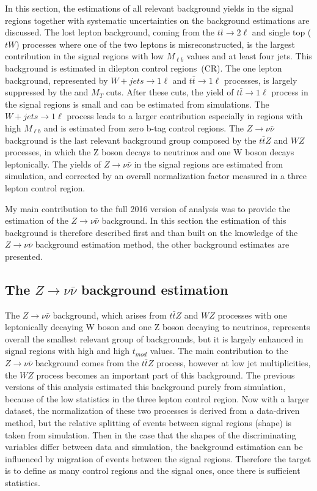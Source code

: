 In this section, the estimations of all relevant background yields in the signal regions together with systematic uncertainties on the background estimations are discussed. The lost lepton background, coming from the $t\bar{t} \to 2 \ell$ and single top ($tW$) processes where one of the two leptons is misreconstructed, is the largest contribution in the signal regions with low $M_{\ell b}$ values and at least four jets. This background is estimated in dilepton control regions~(CR). The one lepton background, represented by $W+jets \to 1\ell$  and $t\bar{t} \to 1\ell$ processes, is largely suppressed by the \MET and $M_{T}$ cuts. After these cuts, the yield of $t\bar{t} \to 1\ell$ process in the signal regions is small and can be estimated from simulations. The $W+jets \to 1\ell$  process leads to a larger contribution especially in regions with high $M_{\ell b}$ and is estimated from zero b-tag control regions. The $Z \to \nu \bar{\nu}$ background is the last relevant background group composed by the $t\bar{t}Z$ and $WZ$ processes, in which the Z boson decays to neutrinos and one W boson decays leptonically. The yields of $Z \to \nu \bar{\nu}$ in the signal regions are estimated from simulation, and corrected by an overall normalization factor measured in a three lepton control region.  

My main contribution to the full 2016 version of analysis was to provide the estimation of the $Z \to \nu \bar{\nu}$ background. In this section the estimation of this background is therefore described first and than built on the knowledge of the $Z \to \nu \bar{\nu}$ background estimation method, the other background estimates are presented.


\subsection{The $Z \to \nu \bar{\nu}$ background estimation}

The $Z \to \nu \bar{\nu}$ background, which arises from $t\bar{t}Z$ and $WZ$ processes with one leptonically decaying W boson and one Z boson decaying to neutrinos, represents overall the smallest relevant group of backgrounds, but it is largely enhanced in signal regions with high \MET and high $t_{mod}$ values. The main contribution to the $Z \to \nu \bar{\nu}$ background comes from the $t\bar{t}Z$ process, however at low jet multiplicities, the $WZ$ process becomes an important part of this background.  The previous versions of this analysis estimated this background purely from simulation, because of the low statistics in the three lepton control region. Now with a larger dataset, the normalization of these two processes is derived from a data-driven method, but the relative splitting of events between signal regions (shape) is taken from simulation. Then in the case that the shapes of the discriminating variables differ between data and simulation, the background estimation can be influenced by migration of events between the signal regions. Therefore the target is to define as many control regions and the signal ones, once there is sufficient statistics. 

